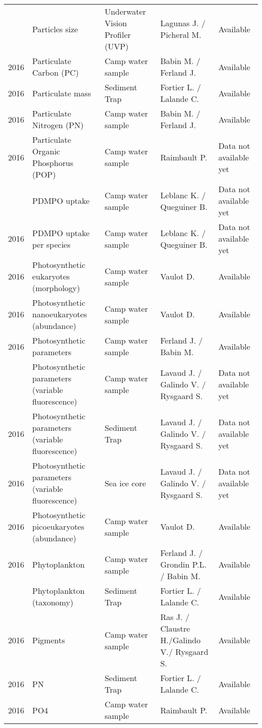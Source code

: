 \documentclass[]{article}
\begin{document}
\begin{landscape}
\begin{longtable}{rllll}
\addlinespace
2016 & Particles size & Underwater Vision Profiler (UVP) & Lagunas J. / Picheral M. & Available\\
2016 & Particulate Carbon (PC) & Camp water sample & Babin M. / Ferland J. & Available\\
2016 & Particulate mass & Sediment Trap & Fortier L. / Lalande C. & Available\\
2016 & Particulate Nitrogen (PN) & Camp water sample & Babin M. / Ferland J. & Available\\
2016 & Particulate Organic Phosphorus (POP) & Camp water sample & Raimbault P. & Data not available yet\\
\addlinespace
2016 & PDMPO uptake & Camp water sample & Leblanc K. / Queguiner B. & Data not available yet\\
2016 & PDMPO uptake per species & Camp water sample & Leblanc K. / Queguiner B. & Data not available yet\\
2016 & Photosynthetic eukaryotes (morphology) & Camp water sample & Vaulot D. & Available\\
2016 & Photosynthetic nanoeukaryotes (abundance) & Camp water sample & Vaulot D. & Available\\
2016 & Photosynthetic parameters & Camp water sample & Ferland J. / Babin M. & Available\\
\addlinespace
2016 & Photosynthetic parameters (variable fluorescence) & Camp water sample & Lavaud J. / Galindo V. / Rysgaard S. & Data not available yet\\
2016 & Photosynthetic parameters (variable fluorescence) & Sediment Trap & Lavaud J. / Galindo V. / Rysgaard S. & Data not available yet\\
2016 & Photosynthetic parameters (variable fluorescence) & Sea ice core & Lavaud J. / Galindo V. / Rysgaard S. & Data not available yet\\
2016 & Photosynthetic picoeukaryotes (abundance) & Camp water sample & Vaulot D. & Available\\
2016 & Phytoplankton & Camp water sample & Ferland J. / Grondin P.L. / Babin M. & Available\\
\addlinespace
2016 & Phytoplankton (taxonomy) & Sediment Trap & Fortier L. / Lalande C. & Available\\
2016 & Pigments & Camp water sample & Ras J. / Claustre H./Galindo V./ Rysgaard S. & Available\\
2016 & PN & Sediment Trap & Fortier L. / Lalande C. & Available\\
2016 & PO4 & Camp water sample & Raimbault P. & Available\\

\end{longtable}
\end{landscape}
\end{document}
